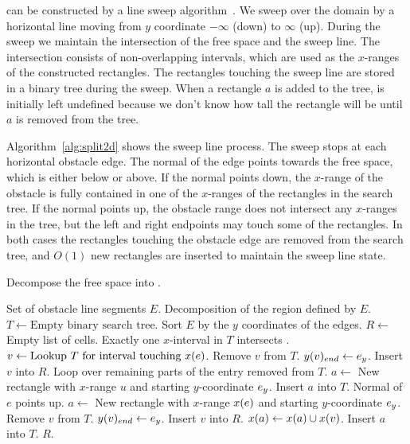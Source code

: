 \documentclass[english,gradu]{tktltiki2018}
\begin{document}
 can be constructed by a line sweep algorithm~\cite{dasnar}.
We sweep over the domain by a horizontal line moving from $y$ coordinate $-\infty$ (down) to $\infty$ (up).
During the sweep we maintain the intersection of the free space \fspace and the sweep line.
The intersection consists of non-overlapping intervals, which are used as the $x$-ranges of the constructed rectangles.
The rectangles touching the sweep line are stored in a binary tree during the sweep.
When a rectangle $a$ is added to the tree,  is initially left undefined because we don't know how tall the rectangle will be until $a$ is removed from the tree.

Algorithm~\ref{alg:split2d} shows the sweep line process.
The sweep stops at each horizontal obstacle edge.
The normal of the edge points towards the free space, which is either below or above.
If the normal points down, the $x$-range of the obstacle is fully contained in one of the $x$-ranges of the rectangles in the search tree.
If the normal points up, the obstacle range does not intersect any $x$-ranges in the tree, but the left and right endpoints may touch some of the rectangles.
In both cases the rectangles touching the obstacle edge are removed from the search tree, and $O(1)$ new rectangles are inserted to maintain the sweep line state.

\begin{algorithm}
\caption{Decompose the free space into .}\label{alg:split2d}
\begin{algorithmic}
\Require Set of obstacle line segments $E$.
\Output Decomposition  of the region defined by $E$.
\State $T\gets \text{Empty binary search tree}$.
\State Sort $E$ by the $y$ coordinates of the edges.
\State $R\gets$ Empty list of cells.
		\Comment Exactly one $x$-interval in $T$ intersects .
		\State $v\gets\text{Lookup $T$ for interval touching \ensuremath{x(e)}}$.
		\State Remove $v$ from $T$.
		\State $y(v)_{end}\gets{e}_y$.
		\State Insert $v$ into $R$.
			\Comment Loop over remaining parts of the entry removed from $T$.
			\State $a\gets$ New rectangle with $x$-range $u$ and starting $y$-coordinate ${e}_y$.
			\State Insert $a$ into $T$.
		\EndFor
	\Else\Comment Normal of $e$ points up.
		\State $a\gets$ New rectangle with $x$-range $x(e)$ and starting $y$-coordinate ${e}_y$.
			\State Remove $v$ from $T$.
			\State $y(v)_{end}\gets{e}_y$.
			\State Insert $v$ into $R$.
			\State $x(a)\gets x(a)\cup x(v)$.
		\EndFor
		\State Insert $a$ into $T$.
	\EndIf
\EndFor
\State \Return $R$.
\end{algorithmic}
\end{algorithm}
\end{document}

